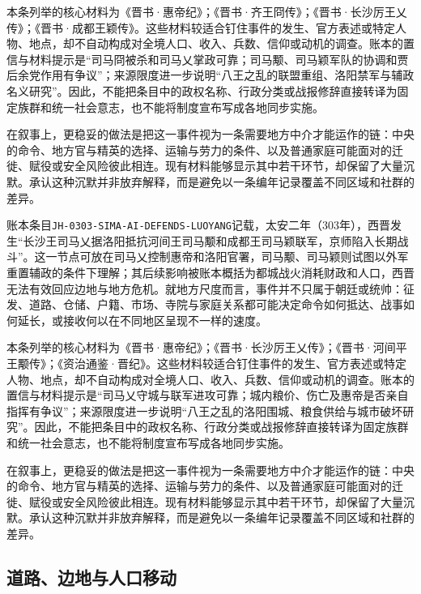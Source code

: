 本条列举的核心材料为《晋书·惠帝纪》；《晋书·齐王冏传》；《晋书·长沙厉王乂传》；《晋书·成都王颖传》。这些材料较适合钉住事件的发生、官方表述或特定人物、地点，却不自动构成对全境人口、收入、兵数、信仰或动机的调查。账本的置信与材料提示是“司马冏被杀和司马乂掌政可靠；司马颙、司马颖军队的协调和贾后余党作用有争议”；来源限度进一步说明“八王之乱的联盟重组、洛阳禁军与辅政名义研究”。因此，不能把条目中的政权名称、行政分类或战报修辞直接转译为固定族群和统一社会意志，也不能将制度宣布写成各地同步实施。

在叙事上，更稳妥的做法是把这一事件视为一条需要地方中介才能运作的链：中央的命令、地方官与精英的选择、运输与劳力的条件、以及普通家庭可能面对的迁徙、赋役或安全风险彼此相连。现有材料能够显示其中若干环节，却保留了大量沉默。承认这种沉默并非放弃解释，而是避免以一条编年记录覆盖不同区域和社群的差异。

账本条目\texttt{JH-0303-SIMA-AI-DEFENDS-LUOYANG}记载，太安二年（303年），西晋发生“长沙王司马乂据洛阳抵抗河间王司马颙和成都王司马颖联军，京师陷入长期战斗”。这一节点可放在司马乂控制惠帝和洛阳官署，司马颙、司马颖则试图以外军重置辅政的条件下理解；其后续影响被账本概括为都城战火消耗财政和人口，西晋无法有效回应边地与地方危机。就地方尺度而言，事件并不只属于朝廷或统帅：征发、道路、仓储、户籍、市场、寺院与家庭关系都可能决定命令如何抵达、战事如何延长，或接收何以在不同地区呈现不一样的速度。

本条列举的核心材料为《晋书·惠帝纪》；《晋书·长沙厉王乂传》；《晋书·河间平王颙传》；《资治通鉴·晋纪》。这些材料较适合钉住事件的发生、官方表述或特定人物、地点，却不自动构成对全境人口、收入、兵数、信仰或动机的调查。账本的置信与材料提示是“司马乂守城与联军进攻可靠；城内粮价、伤亡及惠帝是否亲自指挥有争议”；来源限度进一步说明“八王之乱的洛阳围城、粮食供给与城市破坏研究”。因此，不能把条目中的政权名称、行政分类或战报修辞直接转译为固定族群和统一社会意志，也不能将制度宣布写成各地同步实施。

在叙事上，更稳妥的做法是把这一事件视为一条需要地方中介才能运作的链：中央的命令、地方官与精英的选择、运输与劳力的条件、以及普通家庭可能面对的迁徙、赋役或安全风险彼此相连。现有材料能够显示其中若干环节，却保留了大量沉默。承认这种沉默并非放弃解释，而是避免以一条编年记录覆盖不同区域和社群的差异。

\subsection{道路、边地与人口移动}

